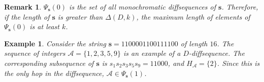\documentclass[10pt,a4paper]{amsart}
\newtheorem{rem}{Remark}
\newtheorem{ex}{Example}
\newtheorem{definition}{Definition}
\begin{document}
\begin{rem}
    $\Psi_{\mathbf{s}}(0)$ is the set of all monochromatic diffsequences of $\mathbf{s}$. Therefore, if the length of $\mathbf{s}$ is greater than $\Delta(D,k)$, the maximum length of elements of $\Psi_{\mathbf{s}}(0)$ is at least $k$.
\end{rem}

\begin{ex}\label{hop example}
Consider the string $\mathbf{s}=1100001100111100$ of length $16$. The sequence of integers $\mathcal{A} = \{1,2,3,5,9\}$ is an example of a $D$-diffsequence. The corresponding subsequence of $\mathbf{s}$ is $s_1s_2s_3s_5s_9 = 11000$, and $H_{\mathcal{A}} = \{2\}$. Since this is the only hop in the diffsequence, $\mathcal{A} \in \Psi_{\mathbf{s}}(1)$.   
\end{ex}





 
\end{document}
